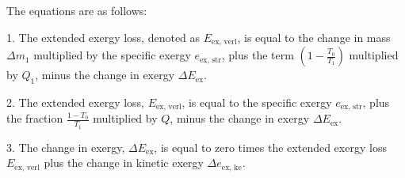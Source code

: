 The equations are as follows:

1. The extended exergy loss, denoted as \( E_{\text{ex, verl}} \), is equal to the change in mass \( \Delta m_1 \) multiplied by the specific exergy \( e_{\text{ex, str}} \), plus the term \( \left( 1 - \frac{T_0}{T_1} \right) \) multiplied by \( Q_1 \), minus the change in exergy \( \Delta E_{\text{ex}} \).

2. The extended exergy loss, \( E_{\text{ex, verl}} \), is equal to the specific exergy \( e_{\text{ex, str}} \), plus the fraction \( \frac{1 - T_0}{T_1} \) multiplied by \( Q \), minus the change in exergy \( \Delta E_{\text{ex}} \).

3. The change in exergy, \( \Delta E_{\text{ex}} \), is equal to zero times the extended exergy loss \( E_{\text{ex, verl}} \) plus the change in kinetic exergy \( \Delta e_{\text{ex, ke}} \).